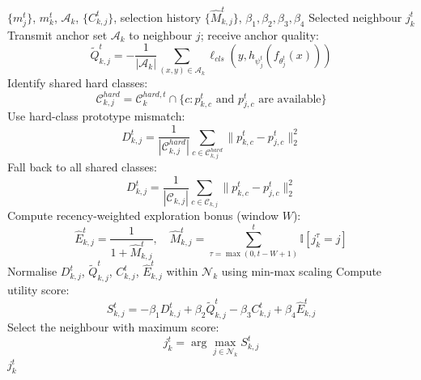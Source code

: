 \documentclass[conference]{IEEEtran}
\begin{document}
\begin{algorithm}[t]
\caption{Task-Aware One-Neighbour Selection at Client $k$}
\label{alg:neighbour_selection}
\footnotesize
\begin{algorithmic}[1]
\REQUIRE $\{m_j^t\}$, $m_k^t$, $\mathcal{A}_k$, $\{C_{k,j}^t\}$, selection history $\{\hat{M}_{k,j}^t\}$, $\beta_1,\beta_2,\beta_3,\beta_4$
\ENSURE Selected neighbour $j_k^t$
    \STATE Transmit anchor set $\mathcal{A}_k$ to neighbour $j$; receive anchor quality:
    \begin{equation}
\tilde{Q}_{k,j}^t
    =
    -\frac{1}{|\mathcal{A}_k|}
    \sum_{(x,y)\in\mathcal{A}_k}
    \ell_{cls}(y,h_{\psi_j^t}(f_{\theta_j^t}(x)))
\end{equation}
    \STATE Identify shared hard classes:
    \begin{equation}
\mathcal{C}_{k,j}^{hard}
    =
    \mathcal{C}_k^{hard,t}
    \cap
    \{c:p_{k,c}^{t}\text{ and }p_{j,c}^{t}\text{ are available}\}
\end{equation}
        \STATE Use hard-class prototype mismatch:
        \begin{equation}
D_{k,j}^{t}
        =
        \frac{1}{|\mathcal{C}_{k,j}^{hard}|}
        \sum_{c\in\mathcal{C}_{k,j}^{hard}}
        \|p_{k,c}^{t}-p_{j,c}^{t}\|_2^2
\end{equation}
    \ELSE
        \STATE Fall back to all shared classes:
        \begin{equation}
D_{k,j}^{t}
        =
        \frac{1}{|\mathcal{C}_{k,j}|}
        \sum_{c\in\mathcal{C}_{k,j}}
        \|p_{k,c}^{t}-p_{j,c}^{t}\|_2^2
\end{equation}
    \ENDIF
    \STATE Compute recency-weighted exploration bonus (window $W$):
    \begin{equation}
\hat{E}_{k,j}^{t}
    =
    \frac{1}{1+\hat{M}_{k,j}^{t}},
    \quad
    \hat{M}_{k,j}^{t}
    =
    \sum_{\tau=\max(0,t-W+1)}^{t}
    \mathbb{I}[j_k^\tau=j]
\end{equation}
    \STATE Normalise $D_{k,j}^t$, $\tilde{Q}_{k,j}^t$, $C_{k,j}^t$, $\hat{E}_{k,j}^t$ within $\mathcal{N}_k$ using min-max scaling
    \STATE Compute utility score:
    \begin{equation}
S_{k,j}^{t}
    =
    -\beta_1 D_{k,j}^{t}
    +
    \beta_2 \tilde{Q}_{k,j}^t
    -
    \beta_3 C_{k,j}^{t}
    +
    \beta_4 \hat{E}_{k,j}^{t}
\end{equation}
\ENDFOR
\STATE Select the neighbour with maximum score:
\begin{equation}
j_k^t
=
\arg\max_{j\in\mathcal{N}_k}
S_{k,j}^{t}
\end{equation}
\RETURN $j_k^t$
\end{algorithmic}
\end{algorithm}
\end{document}
